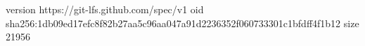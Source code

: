 version https://git-lfs.github.com/spec/v1
oid sha256:1db09ed17efc8f82b27aa5c96aa047a91d2236352f060733301c1bfdff4f1b12
size 21956
